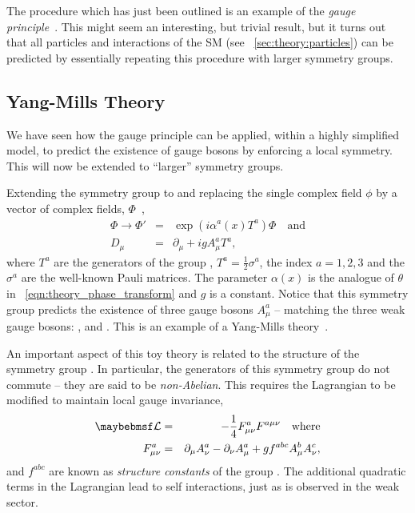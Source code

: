The procedure which has just been outlined is an example of the \emph{gauge
  principle}~\cite{sm_intro}. This might seem an interesting, but trivial
result, but it turns out that all particles and interactions of the \ac{SM} (see
\sec~\ref{sec:theory:particles}) can be predicted by essentially repeating this
procedure with larger symmetry groups.

\subsection{Yang-Mills Theory}
We have seen how the gauge principle can be applied, within a highly simplified
model, to predict the existence of gauge bosons by enforcing a local
symmetry. This will now be extended to ``larger'' symmetry groups.

Extending the symmetry group to \SUtwo and replacing the single complex field
$\phi$ by a vector of complex fields, $\Phi$~\cite{sm_intro,peskin_schroeder},
\begin{eqnarray*}
\Phi \longrightarrow \Phi' &=& \exp\left(i\alpha^a(x)T^a\right)\Phi\quad\textrm{and}\\
D_{\mu} &=& \partial_{\mu} + igA^a_{\mu}T^a,
\end{eqnarray*}
where $T^a$ are the generators of the group \SUtwo, $T^a = \frac{1}{2}\sigma^a$,
the index $a = 1, 2, 3$ and the $\sigma^a$ are the well-known Pauli
matrices. The parameter $\alpha(x)$ is the analogue of $\theta$ in
\eqn~\ref{eqn:theory_phase_transform} and $g$ is a constant. Notice that this
symmetry group predicts the existence of three gauge bosons $A^a_{\mu}$ --
matching the three weak gauge bosons: \PZ, \PWp and \PWm. This is an example of
a Yang-Mills theory~\cite{yangmills}.

An important aspect of this toy theory is related to the structure of the
symmetry group \SUtwo. In particular, the generators of this symmetry group do
not commute -- they are said to be \emph{non-Abelian}. This requires the Lagrangian
to be modified to maintain local gauge invariance,
\begin{eqnarray*}
\lagrangiand &=& -\frac{1}{4}F^a_{\mu\nu}F^{a\mu\nu} \quad\textrm{where}\\
F^a_{\mu\nu} &=& \partial_{\mu} A^a_{\nu} - \partial_{\nu} A^a_{\mu} + g f^{abc}
A^b_{\mu} A^c_{\nu},
\end{eqnarray*}
and $f^{abc}$ are known as \emph{structure constants} of the group \SUtwo. The
additional quadratic terms in the Lagrangian lead to self interactions, just as
is observed in the weak sector.

